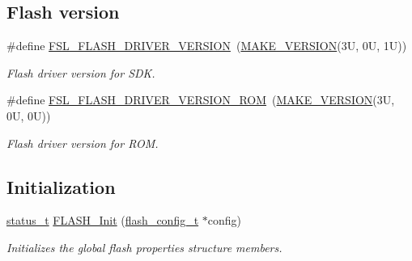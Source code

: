 \subsection*{Flash version}
\begin{DoxyCompactItemize}
\item 
\#define \mbox{\hyperlink{group__ftfx__flash__driver_gae110eddb64c67bfc620e80afd94dd281}{F\+S\+L\+\_\+\+F\+L\+A\+S\+H\+\_\+\+D\+R\+I\+V\+E\+R\+\_\+\+V\+E\+R\+S\+I\+ON}}~(\mbox{\hyperlink{group__ftfx__utilities_ga812138aa3315b0c6953c1a26130bcc37}{M\+A\+K\+E\+\_\+\+V\+E\+R\+S\+I\+ON}}(3\+U, 0\+U, 1\+U))
\begin{DoxyCompactList}\small\item\em Flash driver version for S\+DK. \end{DoxyCompactList}\item 
\#define \mbox{\hyperlink{group__ftfx__flash__driver_gaa7876ee38a9d9186aa38de406c55bef3}{F\+S\+L\+\_\+\+F\+L\+A\+S\+H\+\_\+\+D\+R\+I\+V\+E\+R\+\_\+\+V\+E\+R\+S\+I\+O\+N\+\_\+\+R\+OM}}~(\mbox{\hyperlink{group__ftfx__utilities_ga812138aa3315b0c6953c1a26130bcc37}{M\+A\+K\+E\+\_\+\+V\+E\+R\+S\+I\+ON}}(3\+U, 0\+U, 0\+U))
\begin{DoxyCompactList}\small\item\em Flash driver version for R\+OM. \end{DoxyCompactList}\end{DoxyCompactItemize}
\subsection*{Initialization}
\begin{DoxyCompactItemize}
\item 
\mbox{\hyperlink{group__ksdk__common_gaaabdaf7ee58ca7269bd4bf24efcde092}{status\+\_\+t}} \mbox{\hyperlink{group__ftfx__flash__driver_ga19c10d3524010a2d33369855d74a5c04}{F\+L\+A\+S\+H\+\_\+\+Init}} (\mbox{\hyperlink{group__ftfx__flash__driver_ga0dfc969e6f9e17c17e60d823565141a5}{flash\+\_\+config\+\_\+t}} $\ast$config)
\begin{DoxyCompactList}\small\item\em Initializes the global flash properties structure members. \end{DoxyCompactList}\end{DoxyCompactItemize}

